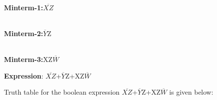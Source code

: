 \documentclass[10pt,a4paper]{report}
\begin{document}
\begin{multicols}{2}
   \center \begin{Karnaugh}
    
    \end{Karnaugh}

 \center  \begin{Karnaugh}
        
       
    \end{Karnaugh}
\\ \centering  \textbf{Minterm-1:}\hspace{2mm}$\overline{XZ}$\\
 
 \center   \begin{Karnaugh}
    \end{Karnaugh}
\\ \centering \textbf{Minterm-2:}\hspace{2mm}$\overline{Y}$Z  \\
   
    \center \begin{Karnaugh}
    \end{Karnaugh}  
\\ \centering \textbf{Minterm-3:}\hspace{2mm}XZ$\overline{W}$ \\ 
 \center \begin{Karnaugh}
    \end{Karnaugh}
   
 \textbf{Expression}: $\overline{XZ}$+$\overline{Y}$Z+XZ$\overline{W}$ \vspace{5mm}\\
\raggedright Truth table for the boolean expression $\overline{XZ}$+$\overline{Y}$Z+XZ$\overline{W}$ is given below:


\end{multicols}
\end{document}
